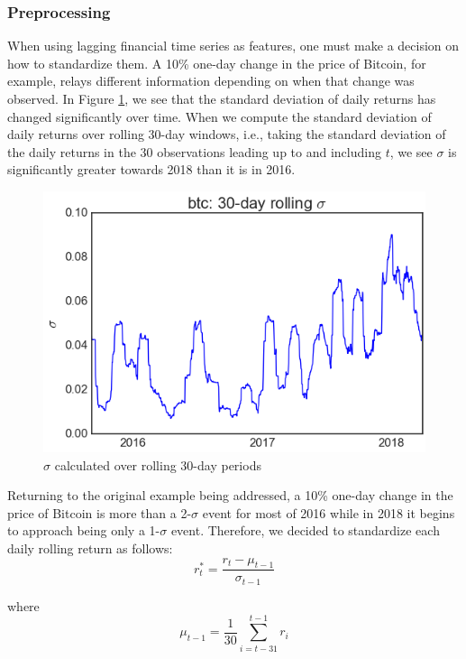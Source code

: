 \documentclass[12pt,twoside]{article}
\begin{document}
\subsubsection{Preprocessing}

When using lagging financial time series as features, one must make a decision on how to standardize them. A 10\% one-day change in the price of Bitcoin, for example, relays different information depending on when that change was observed. In Figure \ref{fig:ma_returns_std_btc}, we see that the standard deviation of daily returns has changed significantly over time. When we compute the standard deviation of daily returns over rolling 30-day windows, i.e., taking the standard deviation of the daily returns in the 30 observations leading up to and including $t$, we see $\sigma$ is significantly greater towards 2018 than it is in 2016.

\begin{figure}[H]
	\begin{center}
		\includegraphics[scale=0.75]{ma_returns_std_btc}
		\caption{$\sigma$ calculated over rolling 30-day periods}
		\label{fig:ma_returns_std_btc}
	\end{center}
\end{figure}

Returning to the original example being addressed, a 10\% one-day change in the price of Bitcoin is more than a 2-$\sigma$ event for most of 2016 while in 2018 it begins to approach being only a 1-$\sigma$ event. Therefore, we decided to standardize each daily rolling return as follows:
$$r^*_t = \frac{r_t - \mu_{t-1}}{\sigma_{t-1}}$$

where 
$$\mu_{t-1}=\frac{1}{30} \sum_{i=t-31}^{t-1} r_i$$
\end{document}
